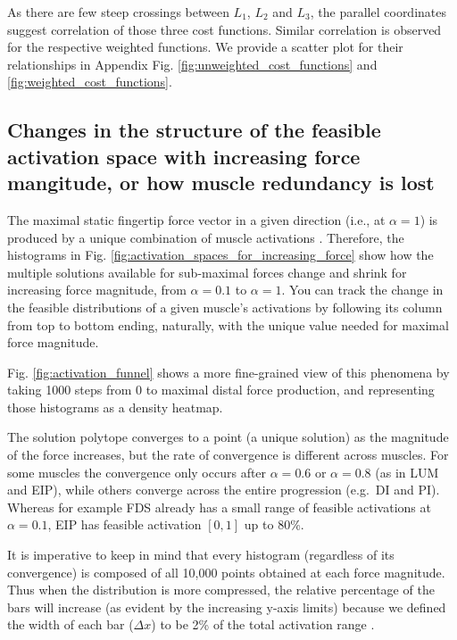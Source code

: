 \documentclass[10pt,letterpaper]{article}
\begin{document}
As there are few steep crossings between $L_1$, $L_2$ and $L_3$, the parallel coordinates suggest correlation of those three cost functions.
Similar correlation is observed for the respective weighted functions.
We provide a scatter plot for their relationships in Appendix Fig. \ref{fig:unweighted_cost_functions} and \ref{fig:weighted_cost_functions}.




\subsection*{Changes in the structure of the feasible activation space with increasing force mangitude, or how muscle redundancy is lost} %
\label{sub:activation_spaces_for_increasing_force}
The maximal static fingertip force vector in a given  direction (i.e., at $\alpha=1$) is produced by  a unique combination of muscle activations \cite{spoor1983balancing,Chao1978Graphical,valero-cuevas2015fundamentals}. Therefore, the histograms in Fig. \ref{fig:activation_spaces_for_increasing_force} show how the multiple solutions available for sub-maximal forces change and shrink  for increasing force magnitude, from $\alpha=0.1$  to $\alpha=1$. You can track the change in the feasible distributions of a given muscle's activations by following its column from top to bottom ending, naturally, with the unique value needed for maximal force magnitude.

Fig. \ref{fig:activation_funnel} shows a more fine-grained view of this phenomena by taking 1000 steps from 0 to maximal distal force production, and representing those histograms as a density heatmap.



The solution polytope converges to a point (a unique solution) as the magnitude of the force increases, but the rate of convergence is different across muscles.
For some muscles the convergence only occurs after $\alpha=0.6$ or $\alpha=0.8$ (as in LUM and EIP), while others converge across the entire progression (e.g.\ DI and PI).
Whereas for example FDS already has a small range of feasible activations at $\alpha=0.1$, EIP has feasible activation $[0,1]$ up to 80\%.

It is imperative to keep in mind that every histogram (regardless of its convergence) is composed of  all 10,000 points obtained at each force magnitude. Thus when the distribution is more compressed, the relative percentage of the bars will increase (as evident by the increasing y-axis limits) because we defined the width of each bar ($\Delta x$) to be 2\% of the total activation range \cite{ball1997elementary}.
\end{document}
